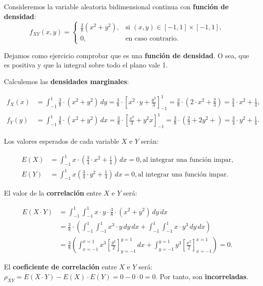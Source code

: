\documentclass[]{book}
\begin{document}
Consideremos la variable aleatoria bidimensional continua con \textbf{función de densidad}:
\[
f_{XY}(x,y)=\begin{cases}
\frac{3}{8}(x^2+y^2), & \mbox{si }(x,y)\in [-1,1]\times [-1,1],\\
0, & \mbox{en caso contrario.}
\end{cases}
\]

Dejamos como ejercicio comprobar que es una \textbf{función de densidad}. O sea, que es positiva y que la integral sobre todo el plano vale 1.

Calculemos las \textbf{densidades marginales}:

\[
\begin{array}{rl}
f_X(x) & = \int_{-1}^{1} \frac{3}{8}\cdot (x^2+y^2)\, dy = \frac{3}{8}\cdot\left[x^2\cdot y+\frac{y^3}{3}\right]_{-1}^1 =\frac{3}{8}\cdot\left(2 \cdot x^2+\frac{2}{3}\right)=\frac{3}{4}
\cdot x^2+\frac{1}{4}, \\
f_Y(y) & = \int_{-1}^{1} \frac{3}{8}\cdot(x^2+y^2)\, dx = \frac{3}{8}\cdot\left[\frac{x^3}{3}+y^2 x\right]_{-1}^1 =\frac{3}{8}\cdot\left(\frac{2}{3}+2 y^2+\right)=\frac{3}{4}\cdot y^2+\frac{1}{4}.
\end{array}
\]

Los valores esperados de cada variable \(X\) e \(Y\) serán:

\[
\begin{array}{rl}
E(X) & =\int_{-1}^1 x \cdot\left(\frac{3}{4} \cdot x^2+\frac{1}{4}\right)\, dx =0, \mbox{al integrar una función impar,}\\
E(Y) & =\int_{-1}^1 x \left(\frac{3}{4}\cdot y^2+\frac{1}{4}\right)\, dx =0, \mbox{al integrar una función impar.}
\end{array}
\]

El valor de la \textbf{correlación} entre \(X\) e \(Y\) será:

\[
\begin{array}{rl}
E(X\cdot Y) & =\int_{-1}^1\int_{-1}^1 x \cdot y \cdot \frac{3}{8}\cdot (x^2+y^2)\, dy\, dx\\ & =\frac{3}{8}\cdot\left(\int_{-1}^1\int_{-1}^1 x^3 \cdot y\, dy \, dx+\int_{-1}^1\int_{-1}^1 x\cdot y^3\, dy \, dx\right) \\ & = \frac{3}{8} \left(\int_{x=-1}^{x=1}x^3 \left[\frac{y^2}{2}\right]_{y=-1}^{y=1}\, dx + \int_{y=-1}^{y=1}y^3 \left[\frac{x^2}{2}\right]_{x=-1}^{x=1}\right)=0.
\end{array}
\]

El \textbf{coeficiente de correlación} entre \(X\) e \(Y\) será: \(\rho_{XY}=E(X\cdot Y)-E(X)\cdot E(Y)=0-0\cdot 0=0\). Por tanto, son \textbf{incorreladas}.
\end{document}
